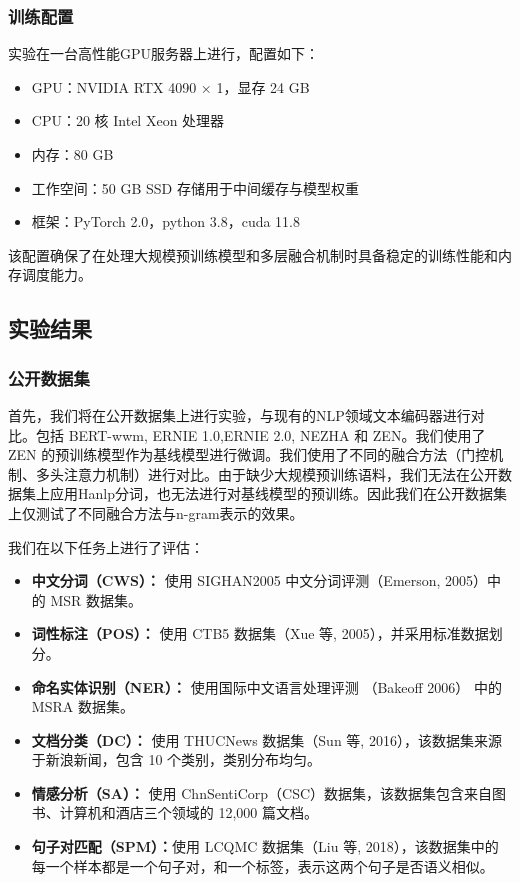 \documentclass[12pt, a4paper]{ctexart}
\begin{document}
\subsubsection{训练配置}
实验在一台高性能GPU服务器上进行，配置如下：

\begin{itemize}
    \item GPU：NVIDIA RTX 4090 × 1，显存 24 GB
    \item CPU：20 核 Intel Xeon 处理器
    \item 内存：80 GB
    \item 工作空间：50 GB SSD 存储用于中间缓存与模型权重
    \item 框架：PyTorch 2.0，python 3.8，cuda 11.8
\end{itemize}

该配置确保了在处理大规模预训练模型和多层融合机制时具备稳定的训练性能和内存调度能力。

\subsection{实验结果}
\subsubsection{公开数据集}
首先，我们将在公开数据集上进行实验，与现有的NLP领域文本编码器进行对比。包括 BERT-wwm\cite{Cui_2021}, ERNIE 1.0\cite{sun2019ernieenhancedrepresentationknowledge},ERNIE 2.0\cite{sun2019ernie20continualpretraining}, NEZHA\cite{wei2021nezhaneuralcontextualizedrepresentation} 和 ZEN\cite{diao-etal-2020-zen}。我们使用了 ZEN 的预训练模型作为基线模型进行微调。我们使用了不同的融合方法（门控机制、多头注意力机制）进行对比。由于缺少大规模预训练语料，我们无法在公开数据集上应用Hanlp分词，也无法进行对基线模型的预训练。因此我们在公开数据集上仅测试了不同融合方法与n-gram表示的效果。

我们在以下任务上进行了评估：
\begin{itemize}
    \item \textbf{中文分词（CWS）：} 使用 SIGHAN2005 中文分词评测（Emerson, 2005）\cite{emerson-2005-second}中的 MSR 数据集。
    \item \textbf{词性标注（POS）：} 使用 CTB5 数据集（Xue 等, 2005）\cite{10.1017/S135132490400364X}，并采用标准数据划分。
    \item \textbf{命名实体识别（NER）：} 使用国际中文语言处理评测 （Bakeoff 2006）\cite{levow-2006-third} 中的 MSRA 数据集。
    \item \textbf{文档分类（DC）：} 使用 THUCNews 数据集（Sun 等, 2016）\cite{sun2016thuctc}，该数据集来源于新浪新闻，包含 10 个类别，类别分布均匀。
    \item \textbf{情感分析（SA）：} 使用 ChnSentiCorp（CSC）数据集\cite{yfwt-wr77-20}，该数据集包含来自图书、计算机和酒店三个领域的 12,000 篇文档。
    \item \textbf{句子对匹配（SPM）：}使用 LCQMC 数据集（Liu 等, 2018）\cite{liu-etal-2018-lcqmc}，该数据集中的每一个样本都是一个句子对，和一个标签，表示这两个句子是否语义相似。
\end{itemize}
\end{document}
